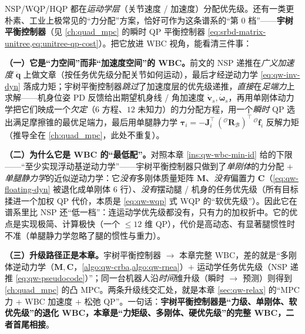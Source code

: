 \begin{insight}\label{ins:qw-unitree-balance}
NSP/WQP/HQP 都在\emph{运动学层}（关节速度 / 加速度）分配优先级。还有一类更朴素、工业上极常见的“力分配”方案，恰好可作为这条谱系的“第 $0$ 档”——\textbf{宇树平衡控制器}（见 \cref{ch:quad_mpc} 的瞬时 QP 平衡控制器 \cref{eq:srbd-matrix-unitree,eq:unitree-qp-cost}）。把它放进 WBC 视角，能看清三件事：

\textbf{（一）它是“力空间”而非“加速度空间”的 WBC。}前文的 NSP 递推在\emph{广义加速度} $\ddot{\boldsymbol{q}}$ 上做文章（按任务优先级分配关节如何运动），最后才经逆动力学 \cref{eq:qw-inv-dyn} 落成力矩；宇树平衡控制器\emph{跳过}了加速度层的优先级递推，\emph{直接}在\emph{足端力}上求解——机身位姿 PD 反馈给出期望机身线 / 角加速度 $\dot{\boldsymbol{v}}_s,\dot{\boldsymbol{\omega}}_s$，再用单刚体动力学把它们映成一个\emph{欠定}（$6$ 方程、$12$ 未知力）的力分配方程，用一个\emph{瞬时} QP 选出满足摩擦锥的最优足端力，最后用单腿静力学 $\boldsymbol{\tau}_i=-\boldsymbol{J}_i^\top\,({}^{\mathcal{O}}\mathbf{R}_{\mathcal{B}})^\top\,{}^{\mathcal{O}}\boldsymbol{f}_i$ 反解力矩（推导全在 \cref{ch:quad_mpc}，此处不重复）。

\textbf{（二）为什么它是 WBC 的“最低配”。}对照本章 \cref{ins:qw-wbc-min-id} 给的下限——“至少实现浮动基逆动力学”——宇树平衡控制器只做到了\emph{单刚体}的力分配 $+$ \emph{单腿静力学}的近似逆动力学：它\emph{没有}多刚体质量矩阵 $\boldsymbol{M}$、\emph{没有}偏置力 $\boldsymbol{C}$（\cref{eq:qw-floating-dyn} 被退化成单刚体 $6$ 行）、\emph{没有}摆动腿 / 机身的任务优先级（所有目标揉进一个加权 QP 代价，本质是 \cref{eq:qw-wqp} 式 WQP 的“软优先级”）。因此它在谱系里比 NSP 还“低一档”：连运动学优先级都没有，只有力的加权折中。它的优点是实现极简、计算极快（一个 $\le12$ 维 QP），代价是高动态、有显著腿惯性时不准（单腿静力学忽略了腿的惯性与重力）。

\textbf{（三）升级路径正是本章。}宇树平衡控制器 $\to$ 本章完整 WBC，差的就是“多刚体逆动力学（$\boldsymbol{M},\boldsymbol{C}$，\cref{algo:qw-crba,algo:qw-rnea}）$+$ 运动学任务优先级（NSP 递推 \cref{eq:qw-pseudocode}）”；同一台机器人沿\emph{时间}维升级（瞬时 $\to$ 预测）则得到 \cref{ch:quad_mpc} 的凸 MPC。两条升级线交汇处，就是本章 \cref{sec:qw-relax} 的“MPC 力 $+$ WBC 加速度 $+$ 松弛 QP”。一句话：\textbf{宇树平衡控制器是“力级、单刚体、软优先级”的退化 WBC，本章是“力矩级、多刚体、硬优先级”的完整 WBC，二者首尾相接}。
\end{insight}

